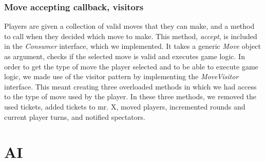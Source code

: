 \documentclass[12pt,a4paper]{scrartcl}
\begin{document}
\subsubsection*{Move accepting callback, visitors}
Players are given a collection of valid moves that they can make, and a method to call when they decided which move to make. This method, \textit{accept},  is included in the \textit{Consumer} interface, which we implemented. It takes a generic \textit{Move} object as argument, checks if the selected move is valid and executes game logic. In order to get the type of move the player selected and to be able to execute game logic, we made use of the visitor pattern by implementing the \textit{MoveVisitor} interface. This meant creating three overloaded methods in which we had access to the type of move used by the player. In these three methods, we removed the used tickets, added tickets to mr. X, moved players, incremented rounds and current player turns, and notified spectators.

\section{AI}
\end{document}
